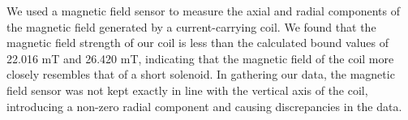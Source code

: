 We used a magnetic field sensor to measure the axial and radial components of the magnetic field generated by a current-carrying coil. We found that the magnetic field strength of our coil is less than the calculated bound values of 22.016 mT and 26.420 mT, indicating that the magnetic field of the coil more closely resembles that of a short solenoid. In gathering our data, the magnetic field sensor was not kept exactly in line with the vertical axis of the coil, introducing a non-zero radial component and causing discrepancies in the data.
